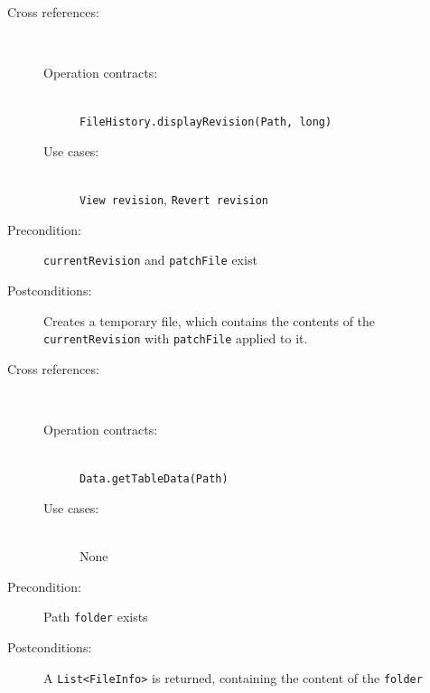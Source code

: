 \documentclass[12pt,a4paper]{article}
\begin{document}
\vspace{0.75cm}

\begin{description}
	\item[Cross references:] \hfill \vspace{-4ex} \\
	\begin{description}
		\item[Operation contracts:] \hfill \\
			\texttt{FileHistory.displayRevision(Path, long)}
		\item[Use cases:] \hfill \\
			\texttt{View revision}, \texttt{Revert revision}
	\end{description}
	\item[Precondition:] \texttt{currentRevision} and \texttt{patchFile} exist
	\item[Postconditions:] Creates a temporary file, which contains the contents of the 		\texttt{currentRevision} with \texttt{patchFile} applied to it.
\end{description}

\vspace{0.75cm}

\begin{description}
	\item[Cross references:] \hfill \vspace{-4ex}  \\
	\begin{description} 
		\item[Operation contracts:] \hfill \\
			\texttt{Data.getTableData(Path)}
		\item[Use cases:] \hfill \\
			None
	\end{description}
	\item[Precondition:] Path \texttt{folder} exists
	\item[Postconditions:] A \texttt{List<FileInfo>} is returned, containing the content of the \texttt{folder}
\end{description}

\vspace{0.75cm}
\end{document}
